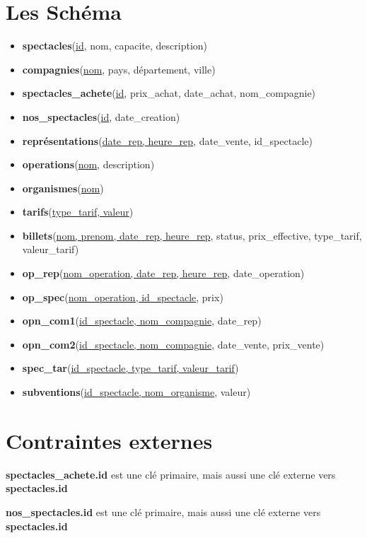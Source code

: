 \documentclass[10pt]{report}
\begin{document}
\section{Les Schéma}
\begin{itemize}
\item \textbf{spectacles}(\underline{id}, nom, capacite, description)
\item \textbf{compagnies}(\underline{nom}, pays, département, ville)
\item \textbf{spectacles\_achete}(\underline{id}, prix\_achat, date\_achat, nom\_compagnie)
\item \textbf{nos\_spectacles}(\underline{id}, date\_creation)
\item \textbf{représentations}(\underline{date\_rep, heure\_rep}, date\_vente, id\_spectacle)
\item \textbf{operations}(\underline{nom}, description)
\item \textbf{organismes}(\underline{nom})
\item \textbf{tarifs}(\underline{type\_tarif, valeur})
\item \textbf{billets}(\underline{nom, prenom, date\_rep, heure\_rep}, status, prix\_effective, type\_tarif, valeur\_tarif)

\item \textbf{op\_rep}(\underline{nom\_operation, date\_rep, heure\_rep}, date\_operation)
\item \textbf{op\_spec}(\underline{nom\_operation, id\_spectacle}, prix)
\item \textbf{opn\_com1}(\underline{id\_spectacle, nom\_compagnie}, date\_rep)
\item \textbf{opn\_com2}(\underline{id\_spectacle, nom\_compagnie}, date\_vente, prix\_vente)
\item \textbf{spec\_tar}(\underline{id\_spectacle, type\_tarif, valeur\_tarif})
\item \textbf{subventions}(\underline{id\_spectacle, nom\_organisme}, valeur)
\end{itemize}

\section{Contraintes externes}
\textbf{spectacles\_achete.id} est une clé primaire, mais aussi une clé externe vers \textbf{spectacles.id}

\textbf{nos\_spectacles.id} est une clé primaire, mais aussi une clé externe vers \textbf{spectacles.id}
\end{document}
